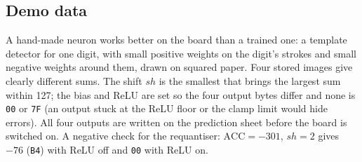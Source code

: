 \subsection{Demo data}

A hand-made neuron works better on the board than a trained one: a template detector for one digit, with small positive weights on the digit's strokes and small negative weights around them, drawn on squared paper. Four stored images give clearly different sums. The shift $sh$ is the smallest that brings the largest sum within 127; the bias and ReLU are set so the four output bytes differ and none is \texttt{00} or \texttt{7F} (an output stuck at the ReLU floor or the clamp limit would hide errors). All four outputs are written on the prediction sheet before the board is switched on. A negative check for the requantiser: $\mathrm{ACC} = -301$, $sh = 2$ gives $-76$ (\texttt{B4}) with ReLU off and \texttt{00} with ReLU on.
